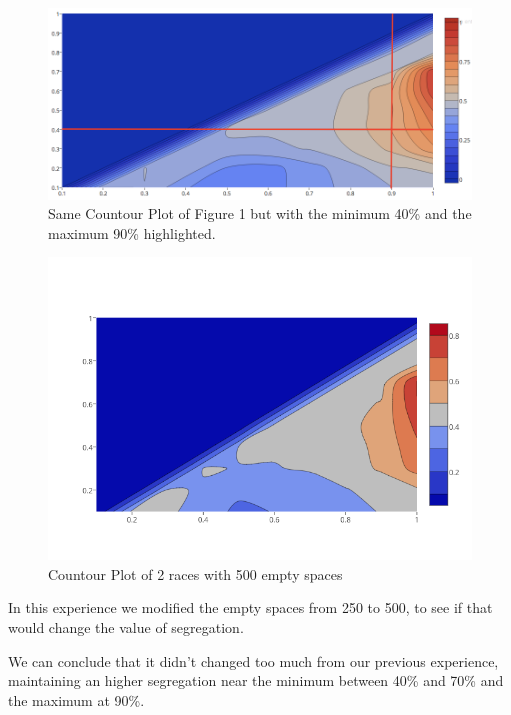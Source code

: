 \documentclass[a4paper,titlepage,11pt]{article}
\begin{document}
\begin{figure}[!h]
    \centering
    \includegraphics[scale=0.40]{img/ploty-a.png}
    \caption{Same Countour Plot of Figure 1 but with the minimum 40\% and the maximum 90\% highlighted.}
\end{figure}

\newpage

\begin{figure}[!h]
    \centering
    \includegraphics[scale=0.50]{img/500emptyspaces.png}
    \caption{Countour Plot of 2 races with 500 empty spaces}
\end{figure}

In this experience we modified the empty spaces from 250 to 500, to see if that would change the value of segregation.

We can conclude that it didn't changed too much from our previous experience, maintaining an higher segregation near the minimum between 40\% and 70\% and the maximum at 90\%.

\newpage
\end{document}
